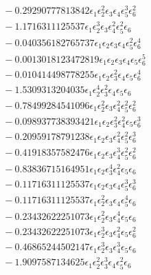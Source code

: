 \documentclass[10pt]{article}
\begin{document}
\begin{align*}
&{}  - 0.29290777813842 \epsilon_{1} \epsilon_{2}^{2} \epsilon_{3} \epsilon_{4} \epsilon_{5}^{3} \epsilon_{6}^{2} \\
&{}  - 1.1716311125537 \epsilon_{1} \epsilon_{2}^{3} \epsilon_{3} \epsilon_{4}^{2} \epsilon_{5}^{2} \epsilon_{6} \\
&{}  - 0.040356182765737 \epsilon_{1} \epsilon_{2} \epsilon_{3} \epsilon_{4} \epsilon_{5}^{2} \epsilon_{6}^{4} \\
&{}  - 0.0013018123472819 \epsilon_{1} \epsilon_{2} \epsilon_{3} \epsilon_{4} \epsilon_{5} \epsilon_{6}^{5} \\
&{}  - 0.010414498778255 \epsilon_{1} \epsilon_{2} \epsilon_{3}^{2} \epsilon_{4} \epsilon_{5} \epsilon_{6}^{4} \\
&{}  - 1.5309313204035 \epsilon_{1} \epsilon_{2}^{4} \epsilon_{3}^{2} \epsilon_{4} \epsilon_{5} \epsilon_{6} \\
&{}  - 0.78499284541096 \epsilon_{1} \epsilon_{2}^{2} \epsilon_{3} \epsilon_{4}^{2} \epsilon_{5}^{2} \epsilon_{6}^{2} \\
&{}  - 0.098937738393421 \epsilon_{1} \epsilon_{2} \epsilon_{3}^{2} \epsilon_{4}^{2} \epsilon_{5} \epsilon_{6}^{3} \\
&{}  - 0.20959178791238 \epsilon_{1} \epsilon_{2} \epsilon_{3} \epsilon_{4}^{2} \epsilon_{5}^{2} \epsilon_{6}^{3} \\
&{}  - 0.41918357582476 \epsilon_{1} \epsilon_{2} \epsilon_{3} \epsilon_{4}^{3} \epsilon_{5}^{2} \epsilon_{6}^{2} \\
&{}  - 0.83836715164951 \epsilon_{1} \epsilon_{2} \epsilon_{3}^{4} \epsilon_{4}^{2} \epsilon_{5} \epsilon_{6} \\
&{}  - 0.11716311125537 \epsilon_{1} \epsilon_{2} \epsilon_{3} \epsilon_{4} \epsilon_{5}^{3} \epsilon_{6}^{3} \\
&{}  - 0.11716311125537 \epsilon_{1} \epsilon_{2}^{2} \epsilon_{3} \epsilon_{4} \epsilon_{5}^{4} \epsilon_{6} \\
&{}  - 0.23432622251073 \epsilon_{1} \epsilon_{2}^{2} \epsilon_{3} \epsilon_{4}^{4} \epsilon_{5} \epsilon_{6} \\
&{}  - 0.23432622251073 \epsilon_{1} \epsilon_{2}^{3} \epsilon_{3} \epsilon_{4}^{2} \epsilon_{5} \epsilon_{6}^{2} \\
&{}  - 0.46865244502147 \epsilon_{1} \epsilon_{2}^{3} \epsilon_{3} \epsilon_{4}^{3} \epsilon_{5} \epsilon_{6} \\
&{}  - 1.9097587134625 \epsilon_{1} \epsilon_{2}^{2} \epsilon_{3}^{3} \epsilon_{4} \epsilon_{5}^{2} \epsilon_{6} \\

\end{align*}
\end{document}
